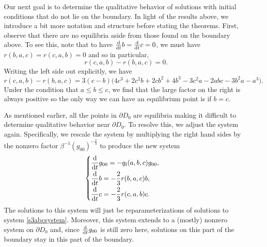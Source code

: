 \documentclass[10pt,a4paper]{amsart}
\numberwithin{equation}{section}
\newcommand{\dtime}{\frac{{\rm d}}{{\rm d} t}} %
\begin{document}
Our next goal is to determine the qualitative behavior of solutions with initial conditions that do not lie on the boundary. In light of the results above, we introduce a bit more notation and structure before stating the theorems. First, observe that there are no equilibria aside from those found on the boundary above. To see this, note that to have $\dtime b = \dtime c = 0$, we must have $r(b, a, c) = r(c, a, b) = 0$ and so in particular,
\[
r(c, a, b) - r(b, a, c) = 0.
\]
Writing the left side out explicitly, we have
\[
r(c, a, b) - r(b, a, c) = 3(c - b)\big(4c^3 + 2c^2b + 2cb^2 + 4b^3 - 3c^2a - 2abc - 3b^2a - a^3\big).
\]
Under the condition that $a \leq b \leq c$, we find that the large factor on the right is always positive so the only way we can have an equilibrium point is if $b = c$.

As mentioned earlier, all the points in $\partial D_{0}$ are equilibria making it difficult to determine qualitative behavior near $\partial D_{0}$. To resolve this, we adjust the system again. Specifically, we rescale the system by multiplying the right hand sides by the nonzero factor $\beta^{-1} (g_{00})^{-\frac{2}{3}}$ to produce the new system
\begin{gather} \label{s3abcadjsystem}
\begin{cases}
\displaystyle \dtime g_{00} = -q_{\rm I}(a, b, c) g_{00}, \vspace{1mm}\\
\displaystyle \dtime b = -\frac{2}{3} r(b, a, c) b, \vspace{1mm}\\
\displaystyle \dtime c = -\frac{2}{3} r(c, a, b) c.
\end{cases}
\end{gather}
The solutions to this system will just be reparameterizations of solutions to system \eqref{s3abcsystem}. Moreover, this system extends to a (mostly) nonzero system on $\partial D_0$ and, since $\dtime g_{00}$ is still zero here, solutions on this part of the boundary stay in this part of the boundary.
\end{document}
